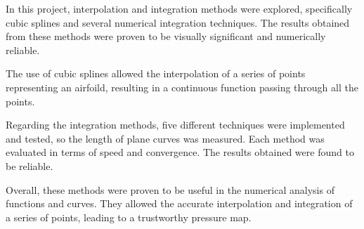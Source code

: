 In this project, interpolation and integration methods were explored, specifically cubic splines and several numerical integration techniques. The results obtained from these methods were proven to be visually significant and numerically reliable.

The use of cubic splines allowed the interpolation of a series of points representing an airfoild, resulting in a continuous function passing through all the points.

Regarding the integration methods, five different techniques were implemented and tested, so the length of plane curves was measured. Each method was evaluated in terms of speed and convergence. The results obtained were found to be reliable.

Overall, these methods were proven to be useful in the numerical analysis of functions and curves. They allowed the accurate interpolation and integration of a series of points, leading to a trustworthy pressure map.
